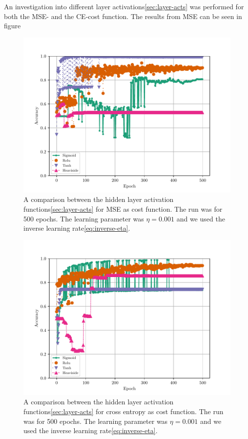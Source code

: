 An investigation into different layer activations\ref{sec:layer-acts} was performed for both the MSE- and the CE-cost function. The results from MSE can be seen in figure 
\begin{figure}[H]
    \centering
    \includegraphics[scale=1.0]{../fig/mlp_epoch_activations_mse.pdf}
    \caption{A comparison between the hidden layer activation functions\ref{sec:layer-acts} for MSE as cost function. The run was for 500 epochs. The learning parameter was $\eta=0.001$ and we used the inverse learning rate\eqref{eq:inverse-eta}.}
    \label{fig:mlp-epoch-activations-mse}
\end{figure}
\begin{figure}[H]
    \centering
    \includegraphics[scale=1.0]{../fig/mlp_epoch_activations_log_loss.pdf}
    \caption{A comparison between the hidden layer activation functions\ref{sec:layer-acts} for cross entropy as cost function. The run was for 500 epochs. The learning parameter was $\eta=0.001$ and we used the inverse learning rate\eqref{eq:inverse-eta}.}
    \label{fig:mlp-epoch-activations-log-loss}
\end{figure}
